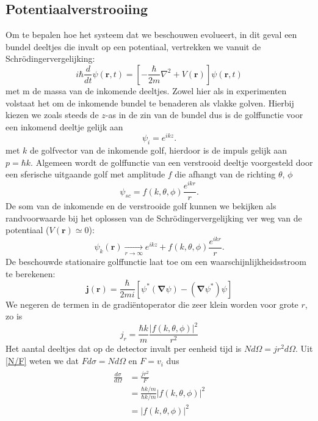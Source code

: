 \documentclass[11pt]{article}
\numberwithin{equation}{section}
\begin{document}
\subsection{Potentiaalverstrooiing}\label{Potential Scattering}
Om te bepalen hoe het systeem dat we beschouwen evolueert, in dit geval een bundel deeltjes die invalt op een potentiaal, vertrekken we vanuit de Schr\"odingervergelijking:
\begin{equation}\label{Schrodinger}
	i\hbar \frac{d}{dt} \psi(\mathbf{r},t) =  \left[ - \frac{\hbar}{2m} \nabla^2 + V(\mathbf{r})\right] \psi(\mathbf{r},t)
\end{equation}
met m de massa van de inkomende deeltjes. Zowel hier als in experimenten volstaat het om de inkomende bundel te benaderen als vlakke golven. Hierbij kiezen we zoals steeds de $z$-as in de zin van de bundel dus is de golffunctie voor een inkomend deeltje gelijk aan
\begin{equation}
	\psi_i = e^{ikz}.
\end{equation}
met $k$ de golfvector van de inkomende golf, hierdoor is de impuls gelijk aan $p = \hbar k$.
Algemeen wordt de golffunctie van een verstrooid deeltje voorgesteld door een sferische uitgaande golf met amplitude $f$ die afhangt van de richting $\theta$, $\phi$
\begin{equation}
\psi_{sc} = f(k, \theta, \phi)\frac{e^{ikr}	}{r}.
\end{equation}
De som van de inkomende en de verstrooide golf kunnen we bekijken als randvoorwaarde bij het oplossen van de Schr\"odingervergelijking ver weg van de potentiaal ($V(\mathbf{r}) \simeq 0$):
\begin{equation}\label{boundary}
\psi_k(\mathbf{r}) \underset{r \rightarrow \infty}\rightarrow e^{ikz}	+ f(k, \theta, \phi)\frac{e^{ikr}	}{r}.
\end{equation}
De beschouwde stationaire golffunctie laat toe om een waarschijnlijkheidsstroom te berekenen:
\begin{equation}
	\mathbf{j}(\mathbf{r}) = \frac{\hbar}{2mi} \left[ \psi^* ( \mathbf{\nabla}\psi ) - (\mathbf{\nabla}\psi^*) \psi \right]
\end{equation}
We negeren de termen in de gradi\"entoperator die zeer klein worden voor grote $r$, zo is
\begin{equation}
	j_r = \frac{\hbar k}{m} \frac{|f(k,\theta,\phi)|^2}{r^2}
\end{equation}
Het aantal deeltjes dat op de detector invalt per eenheid tijd is $Nd\Omega = j r^2 d\Omega$. Uit \eqref{N/F} weten we dat $Fd\sigma = Nd\Omega$ en $F = v_i$ dus 
\begin{align}\label{amplitude}
\begin{split}
	\frac{d\sigma}{d\Omega} &= \frac{jr^2}{F}\\
	&= \frac{\hbar k/ m}{\hbar k/ m}|f(k,\theta,\phi)|^2\\ 
	&= |f(k,\theta,\phi)|^2 
\end{split}
\end{align}
\end{document}
